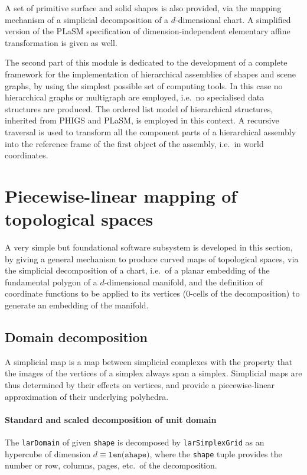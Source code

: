 \documentclass[11pt,oneside]{article}	%
\begin{document}
A set of primitive surface and solid shapes is also provided, via the mapping mechanism of a simplicial decomposition of a $d$-dimensional chart. A simplified version of the PLaSM specification of dimension-independent elementary affine transformation is given as well.

The second part of this module is dedicated to the development of a complete framework for the implementation of hierarchical assemblies of shapes and scene graphs, by using the simplest possible set of computing tools. In this case no hierarchical graphs or multigraph are employed, i.e.~no specialised data structures are produced. The ordered list model of hierarchical structures, inherited from PHIGS and PLaSM, is employed in this context. A recursive traversal is used to transform all the component parts of a hierarchical assembly into the reference frame of the first object of the assembly, i.e.~in world coordinates.

\section{Piecewise-linear mapping of topological spaces}

A very simple but foundational software subsystem is developed in this section, by giving a general mechanism to produce curved maps of topological spaces, via the simplicial decomposition of a chart, i.e.~of a planar embedding of the fundamental polygon of a $d$-dimensional manifold, and the definition of coordinate functions to be applied to its vertices ($0$-cells of the decomposition) to generate an embedding of the manifold.

\subsection{Domain decomposition}

A simplicial map is a map between simplicial complexes with the property that the images of the vertices of a simplex always span a simplex.  Simplicial maps are thus determined by their effects on vertices, and provide a piecewise-linear approximation of their underlying polyhedra.


\paragraph{Standard and scaled decomposition of unit domain}
The \texttt{larDomain} of given \texttt{shape} is decomposed by \texttt{larSimplexGrid} as an hypercube of dimension $d \equiv\texttt{len(shape)}$, where the \texttt{shape} tuple provides the number or row, columns, pages, etc.~of the decomposition.
\end{document}
